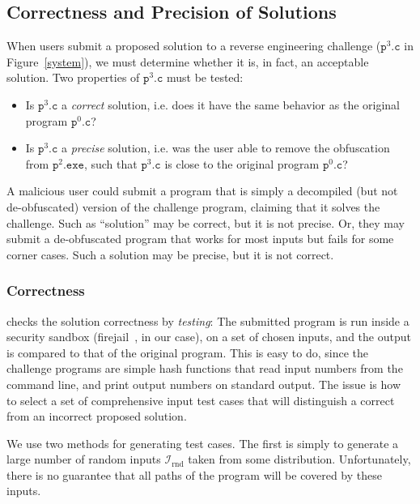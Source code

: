 \subsection{Correctness and Precision of Solutions} \label{solutionanalysis}
When users submit a proposed solution to a reverse engineering challenge ($\mathtt{p}^3.\mathtt{c}$ in Figure~\ref{system}), we must determine whether it is, in fact, an acceptable solution. Two properties of $\mathtt{p}^3.\mathtt{c}$ must be tested:
\begin{itemize}
\itemsep-.5em
    \item Is $\mathtt{p}^3.\mathtt{c}$ a {\em correct} solution, i.e. does it have the same behavior as the original program $\mathtt{p}^0.\mathtt{c}$?
    \item Is $\mathtt{p}^3.\mathtt{c}$ a {\em precise} solution, i.e. was the user able to remove the obfuscation from $\mathtt{p}^2.\mathtt{exe}$, such that $\mathtt{p}^3.\mathtt{c}$ is close to the original program $\mathtt{p}^0.\mathtt{c}$? 
\end{itemize}
A malicious user could submit a program that is simply a decompiled (but not de-obfuscated) version of the challenge program, claiming that it solves the challenge. Such as ``solution'' may be correct, but it is not precise. Or, they may submit a de-obfuscated program that works for most inputs but fails for some corner cases. Such a solution may be precise, but it is not correct.


\subsubsection{Correctness}
\revenge checks the solution correctness by {\em testing}: The submitted program is run inside a security sandbox (firejail~\cite{firejail}, in our case), on a set of chosen inputs, and the output is compared to that of the original program. This is easy to do, since the challenge programs are simple hash functions that read input numbers from the command line, and print output numbers on standard output. The issue is how to select a set of comprehensive input test cases that will distinguish a correct from an incorrect proposed solution. 

We use two methods for generating test cases. The first is simply to generate a large number of random inputs $\mathcal{I}_\mathrm{rnd}$ 
taken from some distribution. Unfortunately, there is no guarantee that all paths of the program will be covered by these inputs. 

